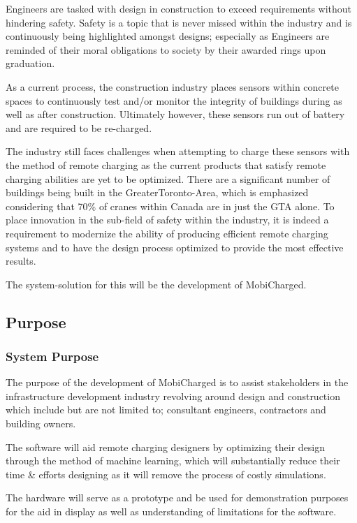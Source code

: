 \documentclass[12pt, titlepage]{article}
\begin{document}
Engineers are tasked with design in construction to exceed requirements without hindering safety. Safety is a topic that is never missed within the industry and is continuously being highlighted amongst designs; especially as Engineers are reminded of their moral obligations to society by their awarded rings upon graduation. 
\par
As a current process, the construction industry places sensors within concrete spaces to continuously test and/or monitor the integrity of buildings during as well as after construction. Ultimately however, these sensors run out of battery and are required to be re-charged.
\par
The industry still faces challenges when attempting to charge these sensors with the method of remote charging as the current products that satisfy remote charging abilities are yet to be optimized. There are a significant number of buildings being built in the GreaterToronto-Area, which is emphasized considering that 70\% of cranes within Canada are in just the GTA alone. To place innovation in the sub-field of safety within the industry, it is indeed a requirement to modernize the ability of producing efficient remote charging systems and to have the design process optimized to provide the most effective results.
\par
The system-solution for this will be the development of MobiCharged. 


\subsection{Purpose}

\subsubsection{System Purpose}
\par
The purpose of the development of MobiCharged is to assist stakeholders in the infrastructure development industry revolving around design and construction which include but are not limited to; consultant engineers, contractors and building owners. 
\par
The software will aid remote charging designers by optimizing their design through the method of machine learning, which will substantially reduce their time \& efforts designing as it will remove the process of costly simulations. 
\par
The hardware will serve as a prototype and be used for demonstration purposes for the aid in display as well as understanding of limitations for the software. 
\end{document}
